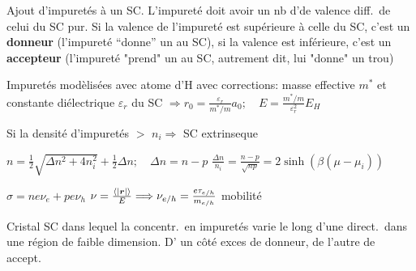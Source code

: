 Ajout d’impuretés à un SC.
L’impureté doit avoir un nb d'\elec de valence diff.\ de celui du SC pur. Si la valence de l’impureté est supérieure à celle du SC, c'est un \textbf{donneur} (l’impureté “donne” un \elec au SC), si la valence est inférieure, c'est un \textbf{accepteur} (l’impureté "prend" un \elec au SC, autrement dit, lui "donne" un trou)
\begin{squishlist}
    \item Impuretés modèlisées avec atome d'H avec corrections: masse effective $m^*$ et constante diélectrique $\varepsilon_r$ du SC 
    $\Longrightarrow r_0 = \frac{\varepsilon_r}{m^*/m} a_0; \quad E=\frac{m^*/m}{\varepsilon_r^2}E_H$
    \item Si la densité d'impuretés $>$ $n_i \Longrightarrow$ SC extrinseque
    \item $n = \frac{1}{2}\sqrt{\Delta n^2 + 4 n_i^2} + \frac{1}{2}\Delta n;\quad \Delta n = n - p$
    \squishsep $\frac{\Delta n }{n_i} = \frac{n-p}{\sqrt{np}} = 2 \sinh (\beta(\mu - \mu_i))$
    \item $\sigma = n e \nu_e + p e \nu_h$ \qquad $\nu = \frac{\braket{|\bm{r}|}}{E} \Longrightarrow \nu_{e/h} = \frac{e \tau_{e/h}}{m_{e/h}}$ mobilité
\end{squishlist}    

Cristal SC dans lequel la concentr.\ en impuretés varie le long d’une direct.\ dans une région de faible dimension. D' un côté exces de donneur, de l'autre de accept.\

